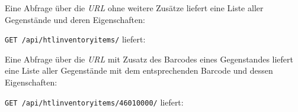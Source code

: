 Eine Abfrage über die \emph{URL}
 ohne weitere Zusätze
liefert eine Liste aller Gegenstände und deren Eigenschaften:

\texttt{GET\ /api/htlinventoryitems/} liefert:

\begin{Shaded}
\begin{Highlighting}[]
\FunctionTok{\{}
    \FunctionTok{:} \OtherTok{[}\FunctionTok{\{}
            \FunctionTok{:} \FunctionTok{,}
            \FunctionTok{:} \FunctionTok{,}
            \FunctionTok{:} \FunctionTok{,}
            \FunctionTok{:} \FunctionTok{,}
            \FunctionTok{:} \FunctionTok{,}
            \FunctionTok{:} \FunctionTok{\{}
                \FunctionTok{:} \FunctionTok{,}
                \ErrorTok{[...]}
            \FunctionTok{\},}
            \FunctionTok{:} \OtherTok{[]}
        \FunctionTok{\}}\OtherTok{,}
        \OtherTok{[}\OtherTok{]}
    \OtherTok{]}
\FunctionTok{\}}
\end{Highlighting}
\end{Shaded}

Eine Abfrage über die \emph{URL}
 mit Zusatz des Barcodes
eines Gegenstandes liefert eine Liste aller Gegenstände mit dem
entsprechenden Barcode und dessen Eigenschaften:

\texttt{GET\ /api/htlinventoryitems/46010000/} liefert:

\begin{Shaded}
\begin{Highlighting}[]
\FunctionTok{\{}
    \FunctionTok{:} \OtherTok{[}\FunctionTok{\{}
            \FunctionTok{:} \FunctionTok{,}
            \FunctionTok{:} \FunctionTok{,}
            \FunctionTok{:} \FunctionTok{,}
            \FunctionTok{:} \FunctionTok{,}
            \FunctionTok{:} \FunctionTok{,}
            \FunctionTok{:} \FunctionTok{\{}
                \FunctionTok{:} \FunctionTok{,}
                \ErrorTok{[...]}
            \FunctionTok{\},}
            \FunctionTok{:} \OtherTok{[]}
        \FunctionTok{\}}
    \OtherTok{]}
\FunctionTok{\}}
\end{Highlighting}
\end{Shaded}


